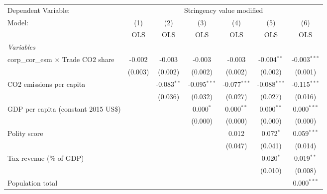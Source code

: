
\begingroup
\centering
\begin{tabular}{lcccccc}
   \toprule
   Dependent Variable: & \multicolumn{6}{c}{Stringency value modified}\\
   Model:                                     & (1)     & (2)           & (3)            & (4)            & (5)            & (6)\\  
                                              &  OLS    & OLS           & OLS            & OLS            & OLS            & OLS\\  
   \midrule
   \emph{Variables}\\
   corp\_cor\_esm $\times$ Trade CO2 share    & -0.002  & -0.003        & -0.003         & -0.003         & -0.004$^{**}$  & -0.003$^{***}$\\   
                                              & (0.003) & (0.002)       & (0.002)        & (0.002)        & (0.002)        & (0.001)\\   
   CO2 emissions per capita                   &         & -0.083$^{**}$ & -0.095$^{***}$ & -0.077$^{***}$ & -0.088$^{***}$ & -0.115$^{***}$\\   
                                              &         & (0.036)       & (0.032)        & (0.027)        & (0.027)        & (0.016)\\   
   GDP per capita (constant 2015 US\$)        &         &               & 0.000$^{*}$    & 0.000$^{**}$   & 0.000$^{**}$   & 0.000$^{***}$\\   
                                              &         &               & (0.000)        & (0.000)        & (0.000)        & (0.000)\\   
   Polity score                               &         &               &                & 0.012          & 0.072$^{*}$    & 0.059$^{***}$\\   
                                              &         &               &                & (0.047)        & (0.041)        & (0.014)\\   
   Tax revenue (\% of GDP)                    &         &               &                &                & 0.020$^{*}$    & 0.019$^{**}$\\   
                                              &         &               &                &                & (0.010)        & (0.008)\\   
   Population total                           &         &               &                &                &                & 0.000$^{***}$\\   

\end{tabular}
